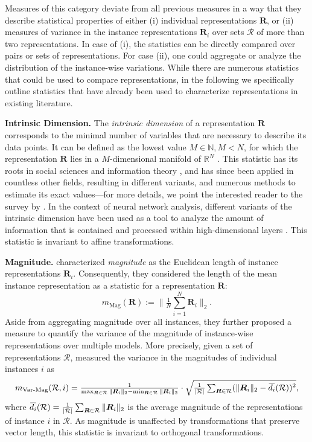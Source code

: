 \documentclass{article}
\newcommand{\citet}{\textcite}
\newcommand{\Nat}{\mathbb{N}}
\newcommand{\Real}{\mathbb{R}}
\newcommand{\R}{\bm{R}}
\newcommand{\ols}[1]{\mskip.5\thinmuskip\overline{\mskip-.5\thinmuskip {#1} \mskip-.5\thinmuskip}\mskip.5\thinmuskip}
\newcommand{\subheader}{\textbf}
\begin{document}
Measures of this category deviate from all previous measures in a way that they describe statistical properties of either (i) individual representations $\R$, or (ii) measures of variance in the instance representations $\R_i$ over sets $\mathcal{R}$ of more than two representations.
In case of (i), the statistics can be directly compared over pairs or sets of representations.
For case (ii), one could aggregate or analyze the distribution of the instance-wise variations.
While there are numerous statistics that could be used to compare representations, in the following we specifically outline statistics that have already been used to characterize representations in existing literature.

\subheader{Intrinsic Dimension.}
The \emph{intrinsic dimension} of a representation $\R$ corresponds to the minimal number of variables that are necessary to describe its data points.
It can be defined as the lowest value $M\in\Nat, M<N$, for which the representation $\R$ lies in a $M$-dimensional manifold of $\Real^N$ \cite{camastra_intrinsic_2016}.
This statistic has its roots in social sciences \cite{shepard_analysis_1962} and information theory \cite{bennet_intrinsic_1969}, and has since been applied in countless other fields, resulting in different variants, and numerous methods to estimate its exact values---for more details, we point the interested reader to the survey by \citet{camastra_intrinsic_2016}.
In the context of neural network analysis, different variants of the intrinsic dimension have been used as a tool to analyze the amount of information that is contained and processed within high-dimensional layers \cite{ma_dimensionality_2018, ansuini_2019_intrinsic,basile2024intrinsic}.
This statistic is invariant to affine transformations.


\subheader{Magnitude.}
\citet{wang_towards_2020} characterized \emph{magnitude} as the Euclidean length of instance representations $\R_i$.
Consequently, they considered the length of the mean instance representation as a statistic for a representation $\R$:
\begin{equation}
    m_{\operatorname{Mag}}(\R) := \|\tfrac{1}{N}\textstyle\sum_{i=1}^N\R_i\|_2.
\end{equation}
Aside from aggregating magnitude over all instances, they further proposed a measure to quantify the variance of the magnitude of instance-wise representations over multiple models.
More precisely, given a set of representations $\mathcal{R}$, \citet{wang_towards_2020} measured the variance in the magnitudes of individual instances $i$ as
\begin{equation}
    m_{\operatorname{Var-Mag}}(\mathcal{R},i)=\tfrac{1}{\max_{\R\in\mathcal{R}}\|\R_i\|_2 - \min_{\R\in\mathcal{R}}\|\R_i\|_2}
    \cdot \sqrt{\tfrac{1}{|\mathcal{R}|}\textstyle\sum_{\R \in \mathcal{R}}(\|\R_i\|_2 - \ols{d_i}(\mathcal{R}))^2},
\end{equation}
where $\ols{d_i}(\mathcal{R})=\tfrac{1}{|\mathcal{R}|}\textstyle\sum_{\R \in \mathcal{R}}\|\R_i\|_2$ is the average magnitude of the representations of instance $i$ in $\mathcal{R}$.
As magnitude is unaffected by transformations that preserve vector length, this statistic is invariant to orthogonal transformations.
\end{document}
